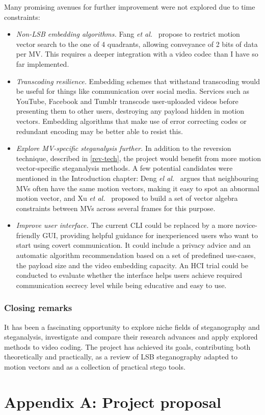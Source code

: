 \documentclass[12pt,british,twoside,notitlepage,usenames,dvipsnames,hypens,final]{report}
\numberwithin{equation}{section}
\numberwithin{figure}{section}
\begin{document}
Many promising avenues for further improvement were not explored due to time constraints:
\begin{itemize}
\item \textit{Non-LSB embedding algorithms.} Fang \emph{et al.}~\cite{fang2006data} propose to restrict motion vector search to the one of 4 quadrants, allowing conveyance of 2 bits of data per MV. This requires a deeper integration with a video codec than I have so far implemented.
\item \textit{Transcoding resilience.} Embedding schemes that withstand transcoding would be useful for things like communication over social media. Services such as YouTube, Facebook and Tumblr transcode user-uploaded videos before presenting them to other users, destroying any payload hidden in motion vectors. Embedding algorithms that make use of error correcting codes or redundant encoding may be better able to resist this.
\item \textit{Explore MV-specific steganalysis further.} In addition to the reversion technique, described in \ref{rev-tech}, the project would benefit from more motion vector-specific steganalysis methods. A few potential candidates were mentioned in the Introduction chapter: Deng \emph{el al.}~\cite{deng2012digital} argues that neighbouring MVs often have the same motion vectors, making it easy to spot an abnormal motion vector, and Xu \emph{et al.}~\cite{xu2013video} proposed to build a set of vector algebra constraints between MVs across several frames for this purpose.
\item \textit{Improve user interface.} The current CLI could be replaced by a more novice-friendly GUI, providing helpful guidance for inexperienced users who want to start using covert communication. It could include a privacy advice and an automatic algorithm recommendation based on a set of predefined use-cases, the payload size and the video embedding capacity. An HCI trial could be conducted to evaluate whether the interface helps users achieve required communication secrecy level while being educative and easy to use. 
\end{itemize}

\subsection*{Closing remarks}

It has been a fascinating opportunity to explore niche fields of steganography and steganalysis, investigate and compare their research advances and apply explored methods to video coding. The project has achieved its goals, contributing both theoretically and practically, as a review of LSB steganography adapted to motion vectors and as a collection of practical stego tools.

\cleardoublepage



\appendix
\cleardoublepage
{}
\chapter*{Appendix A: Project proposal}


\end{document}
